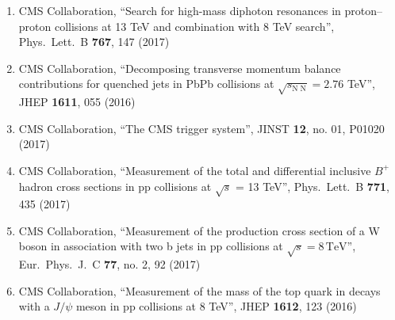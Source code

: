 \begin{enumerate}
\item CMS Collaboration, ``Search for high-mass diphoton resonances in proton–proton collisions at 13 TeV and combination with 8 TeV search'', Phys.\ Lett.\ B {\bf 767}, 147 (2017)

\item CMS Collaboration, ``Decomposing transverse momentum balance contributions for quenched jets in PbPb collisions at $ \sqrt{s_{\mathrm{N}\;\mathrm{N}}}=2.76 $ TeV'', JHEP {\bf 1611}, 055 (2016)

\item CMS Collaboration, ``The CMS trigger system'', JINST {\bf 12}, no. 01, P01020 (2017)

\item CMS Collaboration, ``Measurement of the total and differential inclusive $B^+$ hadron cross sections in pp collisions at $\sqrt{s}$ = 13 TeV'', Phys.\ Lett.\ B {\bf 771}, 435 (2017)

\item CMS Collaboration, ``Measurement of the production cross section of a W boson in association with two b jets in pp collisions at $\sqrt{s} = 8{\,\mathrm{{TeV}}} $'', Eur.\ Phys.\ J.\ C {\bf 77}, no. 2, 92 (2017)

\item CMS Collaboration, ``Measurement of the mass of the top quark in decays with a $J/\psi$ meson in pp collisions at 8 TeV'', JHEP {\bf 1612}, 123 (2016)


\end{enumerate}
